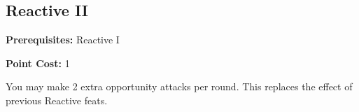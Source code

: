 \subsection{Reactive II}\label{feat:reactive2}

\noindent
\textbf{Prerequisites:} Reactive I

\noindent
\textbf{Point Cost:} 1

You may make 2 extra opportunity attacks per round. This replaces the effect
of previous Reactive feats.
